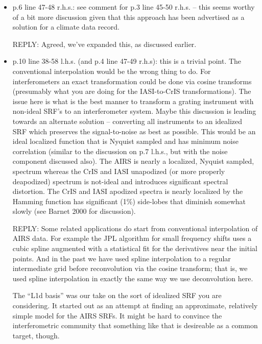 \documentclass[11pt]{article}
\newcommand {\reply} {\mbox{\small REPLY}}
\begin{document}
\begin{itemize}
  \reply: This is a good point, but a problem for any sounder 
  to sounder translation.  I think the best we can do here is to
  mention this and cite Barnet et al. 2000 again for this matter.
  We could model the correlation and add correlated noise to the
  CrIS radiances to better match the AIRS to CrIS translation, if
  that seems desirable.  But that's a matter for future work.

\item p.6 line 47-48 r.h.s.: see comment for p.3 line 45-50 r.h.s. –
  this seems worthy of a bit more discussion given that this
  approach has been advertised as a solution for a climate data
  record.

  \reply: Agreed, we've expanded this, as discussed earlier.

\item p.10 line 38-58 l.h.s. (and p.4 line 47-49 r.h.s): this is a
  trivial point. The conventional interpolation would be the wrong
  thing to do. For interferometers an exact transformation could be
  done via cosine transforms (presumably what you are doing for the
  IASI-to-CrIS transformations). The issue here is what is the best
  manner to transform a grating instrument with non-ideal SRF’s to
  an interferometer system. Maybe this discussion is leading towards
  an alternate solution – converting all instruments to an idealized
  SRF which preserves the signal-to-noise as best as possible. This
  would be an ideal localized function that is Nyquist sampled and
  has minimum noise correlation (similar to the discussion on p.7
  l.h.s., but with the noise component discussed also). The AIRS is
  nearly a localized, Nyquist sampled, spectrum whereas the CrIS and
  IASI unapodized (or more properly deapodized) spectrum is
  not-ideal and introduces significant spectral distortion. The CrIS
  and IASI apodized spectra is nearly localized by the Hamming
  function has significant (1\%) side-lobes that diminish somewhat
  slowly (see Barnet 2000 for discussion).

  \reply: Some related applications do start from conventional
  interpolation of AIRS data.  For example the JPL algorithm for
  small frequency shifts uses a cubic spline augmented with a
  statistical fit for the derivatives near the initial points.  
  And in the past we have used spline interpolation to a regular
  intermediate grid before reconvolution via the cosine transform;
  that is, we used spline interpolation in exactly the same way we
  use deconvolution here.
  
  The ``L1d basis'' was our take on the sort of idealized SRF you
  are considering.  It started out as an attempt at finding an
  approximate, relatively simple model for the AIRS SRFs.  It might
  be hard to convince the interferometric community that something
  like that is desireable as a common target, though.

\end{itemize}
\end{document}
